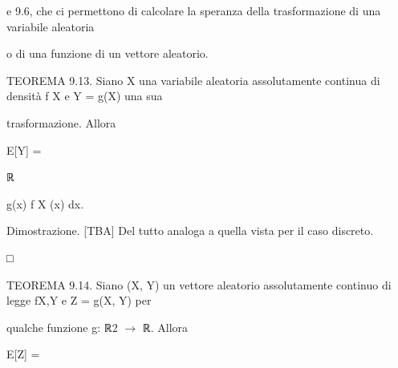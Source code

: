 \documentclass[a4paper,portrait,12pt]{article}
\begin{document}
\begin{flushleft}
e 9.6, che ci permettono di calcolare la speranza della trasformazione di una variabile aleatoria
\end{flushleft}


\begin{flushleft}
o di una funzione di un vettore aleatorio.
\end{flushleft}


\begin{flushleft}
TEOREMA 9.13. Siano X una variabile aleatoria assolutamente continua di densit\`{a} f X e Y = g(X) una sua
\end{flushleft}


\begin{flushleft}
trasformazione. Allora
\end{flushleft}


\begin{flushleft}
E[Y] =
\end{flushleft}





\begin{flushleft}
ℝ
\end{flushleft}





\begin{flushleft}
g(x) f X (x) dx.
\end{flushleft}





\begin{flushleft}
Dimostrazione. [TBA] Del tutto analoga a quella vista per il caso discreto.
\end{flushleft}





□





\begin{flushleft}
TEOREMA 9.14. Siano (X, Y) un vettore aleatorio assolutamente continuo di legge fX,Y e Z = g(X, Y) per
\end{flushleft}


\begin{flushleft}
qualche funzione g: ℝ2 $\rightarrow$ ℝ. Allora
\end{flushleft}


\begin{flushleft}
E[Z] =
\end{flushleft}
\end{document}
